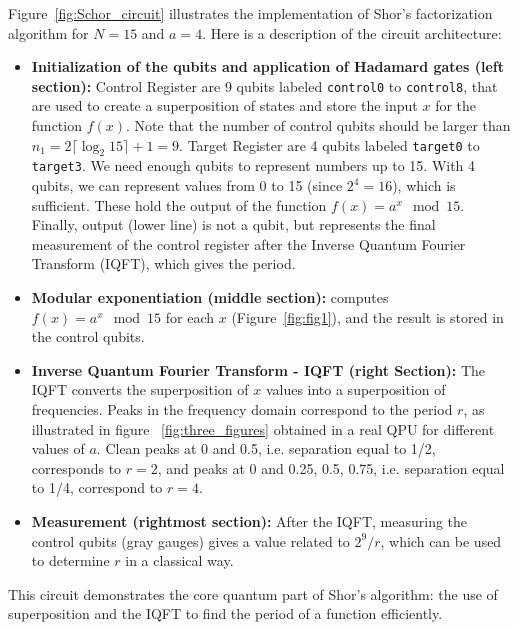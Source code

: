 \documentclass[conference,twoside]{IEEEtran}
\begin{document}
Figure~\ref{fig:Schor_circuit} illustrates the implementation of Shor's factorization algorithm for $N=15$ and $a=4$. Here is a description of the circuit architecture: 

\begin{itemize}
\item \textbf{Initialization of the qubits and application of Hadamard gates (left section):} Control Register are 9 qubits labeled \texttt{control0} to \texttt{control8}, that are used to create a superposition of states and store the input \( x \) for the function \( f(x) \). Note that the number of control qubits should be larger than \(n_1 = 2\lceil \log_2 15 \rceil +1 =  9 \). Target Register are 4 qubits labeled \texttt{target0} to \texttt{target3}. We need enough qubits to represent numbers up to 15. With 4 qubits, we can represent values from 0 to 15 (since \( 2^4 = 16 \)), which is sufficient. These hold the output of the function \( f(x) = a^x \mod {15} \). Finally, output (lower line) is not a qubit, but represents the final measurement of the control register after the Inverse Quantum Fourier Transform (IQFT), which gives the period.
\item \textbf{Modular exponentiation (middle section):} computes \( f(x) = a^x \mod {15} \) for each \( x \) (Figure~\ref{fig:fig1}), and the result is stored in the control qubits.
\item \textbf{Inverse Quantum Fourier Transform - IQFT (right Section):} The IQFT converts the superposition of \( x \) values into a superposition of frequencies. Peaks in the frequency domain correspond to the period \( r \), as illustrated in figure ~\ref{fig:three_figures} obtained in a real QPU for different values of $a$. Clean peaks at 0 and 0.5, i.e. separation equal to 1/2, corresponds to $r=2$, and peaks at 0 and 0.25, 0.5, 0.75, i.e. separation equal to 1/4, correspond to $r=4$.
\item \textbf{Measurement (rightmost section):} After the IQFT, measuring the control qubits (gray gauges) gives a value related to \( {2^9} / {r} \), which can be used to determine \( r \) in a classical way. 
\end{itemize}

This circuit demonstrates the core quantum part of Shor's algorithm: the use of superposition and the IQFT to find the period of a function efficiently.
\end{document}

